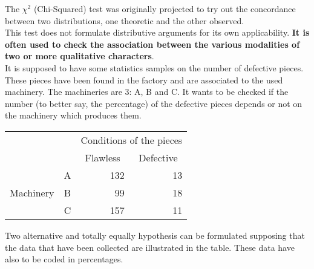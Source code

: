 
\begin{frame}
  \vspace*{.25cm}
  The  $ \chi^2 $ (Chi-Squared) test was originally projected to try out the concordance between two distributions, one theoretic and the other observed.\\
  \vspace*{.5cm}
  This test does not formulate distributive arguments for its own applicability. \textbf{It is often used to check the association between the various modalities of two or more qualitative characters}.\\
  \vspace*{.5cm}
  It is supposed to have some statistics samples on the number of defective pieces. These pieces have been found in the factory and are associated to the used machinery. The machineries are 3: A, B and C. It wants to be checked if the number (to better say, the percentage) of the defective pieces depends or not on the machinery which produces them.
\end{frame}

\begin{frame}
  \vspace*{.5cm}
  \begin{table}
    \begin{tabular}{|c|c|r|r|}
      \cline{3-4}
      \multicolumn{2}{c}{} & \multicolumn{2}{|c|}{Conditions of the pieces}\\ \cline{3-4}
      \multicolumn{2}{c}{} & \multicolumn{1}{|c|}{\hspace*{.25cm}Flawless\hspace*{.25cm}} & \multicolumn{1}{|c|}{Defective}\\ \hline
      & \multicolumn{1}{|c|}{\hspace*{.5cm}A\hspace*{.5cm}} & \multicolumn{1}{|r|}{132} & \multicolumn{1}{|r|}{13}\\ \cline{2-4}
      \multicolumn{1}{|c|}{Machinery} & \multicolumn{1}{|c|}{B} & \multicolumn{1}{|r|}{99} & \multicolumn{1}{|r|}{18}\\ \cline{2-4}
      & \multicolumn{1}{|c|}{C} & \multicolumn{1}{|r|}{157} & \multicolumn{1}{|r|}{11}\\ \hline
    \end{tabular}
  \end{table} 
  \vspace*{.5cm}
  Two alternative and totally equally hypothesis can be formulated supposing that the data that have been collected are illustrated in the table. These data have also to be coded in percentages.
\end{frame}


